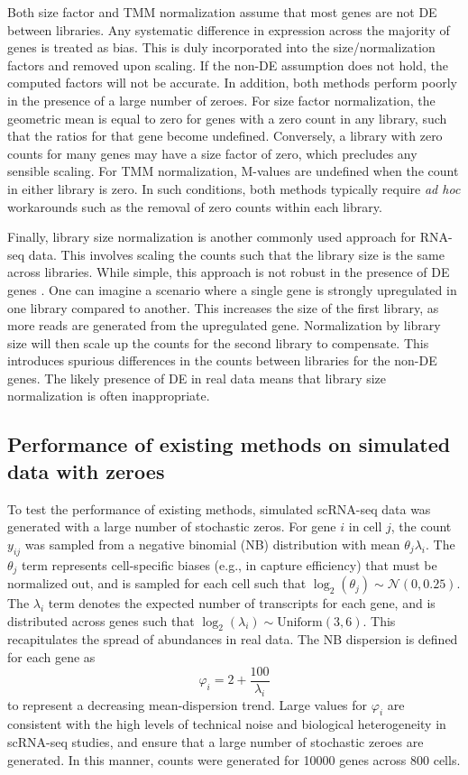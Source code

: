 \documentclass{article}
\begin{document}
Both size factor and TMM normalization assume that most genes are not DE between libraries.
Any systematic difference in expression across the majority of genes is treated as bias.
This is duly incorporated into the size/normalization factors and removed upon scaling.
If the non-DE assumption does not hold, the computed factors will not be accurate.
In addition, both methods perform poorly in the presence of a large number of zeroes.
For size factor normalization, the geometric mean is equal to zero for genes with a zero count in any library, such that the ratios for that gene become undefined.
Conversely, a library with zero counts for many genes may have a size factor of zero, which precludes any sensible scaling.
For TMM normalization, M-values are undefined when the count in either library is zero.
In such conditions, both methods typically require \textit{ad hoc} workarounds such as the removal of zero counts within each library.

Finally, library size normalization is another commonly used approach for RNA-seq data.
This involves scaling the counts such that the library size is the same across libraries.
While simple, this approach is not robust in the presence of DE genes \cite{robinson2010scaling}.
One can imagine a scenario where a single gene is strongly upregulated in one library compared to another.
This increases the size of the first library, as more reads are generated from the upregulated gene.
Normalization by library size will then scale up the counts for the second library to compensate.
This introduces spurious differences in the counts between libraries for the non-DE genes.
The likely presence of DE in real data means that library size normalization is often inappropriate.

\subsection{Performance of existing methods on simulated data with zeroes}
To test the performance of existing methods, simulated scRNA-seq data was generated with a large number of stochastic zeros.
For gene $i$ in cell $j$, the count $y_{ij}$ was sampled from a negative binomial (NB) distribution with mean $\theta_{j}\lambda_{i}$.
The $\theta_{j}$ term represents cell-specific biases (e.g., in capture efficiency) that must be normalized out, 
    and is sampled for each cell such that $\log_2(\theta_j) \sim \mathcal{N}(0, 0.25)$.
The $\lambda_{i}$ term denotes the expected number of transcripts for each gene, and is distributed across genes such that $\log_2(\lambda_i) \sim \mbox{Uniform}(3, 6)$.
This recapitulates the spread of abundances in real data.
The NB dispersion is defined for each gene as 
\[
    \varphi_i = 2 + \frac{100}{\lambda_i}
\]
to represent a decreasing mean-dispersion trend.
Large values for $\varphi_i$ are consistent with the high levels of technical noise and biological heterogeneity in scRNA-seq studies,
    and ensure that a large number of stochastic zeroes are generated.
In this manner, counts were generated for 10000 genes across 800 cells.
\end{document}
